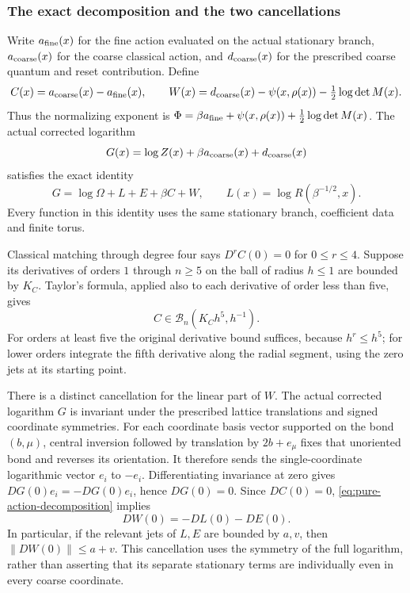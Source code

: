 \subsubsection{The exact decomposition and the two cancellations}
Write $a_{\rm fine}(x)$ for the fine action evaluated on the actual
stationary branch, $a_{\rm coarse}(x)$ for the coarse classical
action, and $d_{\rm coarse}(x)$ for the prescribed coarse quantum
and reset contribution. Define
\[
 C(x)=a_{\rm coarse}(x)-a_{\rm fine}(x),\qquad
 W(x)=d_{\rm coarse}(x)
             -\psi(x,\rho(x))-\tfrac12\log\det M(x).
\]
Thus the normalizing exponent is
$\Phi=\beta a_{\rm fine}+\psi(x,\rho(x))+\tfrac12\log\det M(x)$.
The actual corrected logarithm
\[
                  G(x)=\log Z(x)+\beta a_{\rm coarse}(x)
                                      +d_{\rm coarse}(x)
\]
satisfies the exact identity
\begin{equation}\label{eq:pure-action-decomposition}
                G=\log\Omega+L+E+\beta C+W,
                 \qquad L(x)=\log R(\beta^{-1/2},x).
\end{equation}
Every function in this identity uses the same stationary branch,
coefficient data and finite torus.

Classical matching through degree four says
$D^rC(0)=0$ for $0\le r\le4$. Suppose its derivatives of orders
$1$ through $n\ge5$ on the ball of radius $h\le1$ are bounded
by $K_C$. Taylor's formula, applied also to each derivative of
order less than five, gives
\begin{equation}\label{eq:pure-classical-fifth}
                    C\in\mathcal B_n(K_Ch^5,h^{-1}).
\end{equation}
For orders at least five the original derivative bound suffices,
because $h^r\le h^5$; for lower orders integrate the fifth derivative
along the radial segment, using the zero jets at its starting point.

There is a distinct cancellation for the linear part of $W$.
The actual corrected logarithm $G$ is invariant under the prescribed
lattice translations and signed coordinate symmetries. For each
coordinate basis vector supported on the bond $(b,\mu)$, central
inversion followed by translation by $2b+e_\mu$ fixes that
unoriented bond and reverses its orientation. It therefore sends
the single-coordinate logarithmic vector $e_i$ to $-e_i$. Differentiating invariance at zero gives
$DG(0)e_i=-DG(0)e_i$, hence $DG(0)=0$.
Since $DC(0)=0$, \eqref{eq:pure-action-decomposition} implies
\[
                         DW(0)=-DL(0)-DE(0).
\]
In particular, if the relevant jets of $L,E$ are bounded by $a,v$,
then $\|DW(0)\|\le a+v$. This cancellation uses the symmetry of
the full logarithm, rather than asserting that its separate
stationary terms are individually even in every coarse coordinate.

